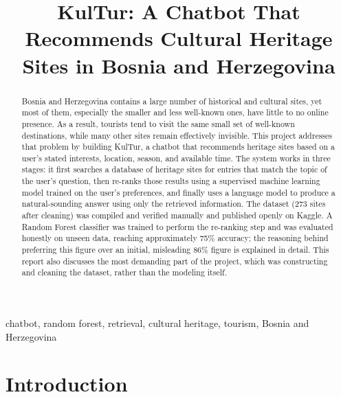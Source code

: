 \documentclass[conference]{IEEEtran}
\begin{document}
\title{KulTur: A Chatbot That Recommends Cultural Heritage Sites in Bosnia and Herzegovina}

\author{
}

\maketitle

\begin{abstract}
Bosnia and Herzegovina contains a large number of historical and cultural sites, yet most of them, especially the smaller and less well-known ones, have little to no online presence. As a result, tourists tend to visit the same small set of well-known destinations, while many other sites remain effectively invisible. This project addresses that problem by building KulTur, a chatbot that recommends heritage sites based on a user's stated interests, location, season, and available time. The system works in three stages: it first searches a database of heritage sites for entries that match the topic of the user's question, then re-ranks those results using a supervised machine learning model trained on the user's preferences, and finally uses a language model to produce a natural-sounding answer using only the retrieved information. The dataset (273 sites after cleaning) was compiled and verified manually and published openly on Kaggle. A Random Forest classifier was trained to perform the re-ranking step and was evaluated honestly on unseen data, reaching approximately 75\% accuracy; the reasoning behind preferring this figure over an initial, misleading 86\% figure is explained in detail. This report also discusses the most demanding part of the project, which was constructing and cleaning the dataset, rather than the modeling itself.
\end{abstract}

\begin{IEEEkeywords}
chatbot, random forest, retrieval, cultural heritage, tourism, Bosnia and Herzegovina
\end{IEEEkeywords}

\section{Introduction}
\end{document}
